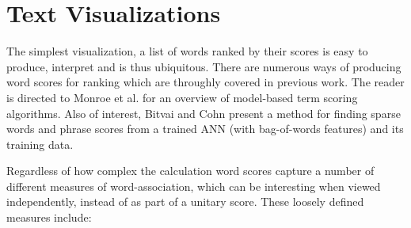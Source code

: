 \documentclass[11pt]{article}
\begin{document}
\section{Text Visualizations}
\label{related}
The simplest visualization, a list of words ranked by their scores is easy to produce, interpret and is thus ubiquitous.  There are numerous ways of producing word scores for ranking which are throughly covered in previous work.  The reader is directed to Monroe et al.  for an overview of model-based term scoring algorithms.  Also of interest, Bitvai and Cohn  present a method for finding sparse words and phrase scores from a trained ANN (with bag-of-words features) and its training data. 

Regardless of how complex the calculation word scores capture a number of different measures of word-association, which can be interesting when viewed independently, instead of as part of a unitary score.  These loosely defined measures include:  \vspace{-0.1in}
\end{document}
